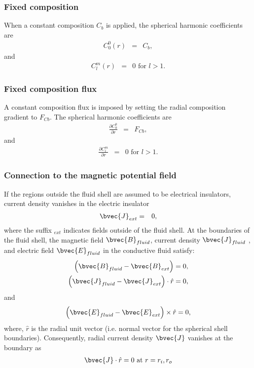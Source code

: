 \subsubsection{Fixed composition}
When a constant composition $C_{b}$ is applied, the spherical harmonic coefficients are 
%
\begin{eqnarray}
C_{0}^{0}(r) & = & C_{b},
\nonumber
\end{eqnarray}
%
and 
%
\begin{eqnarray}
C_{l}^{m}(r) & = & 0 \mbox{ for } l > 1.
\nonumber
\end{eqnarray}
%
\subsubsection{Fixed composition flux}
A constant composition flux is imposed by setting the radial composition gradient to $F_{Cb}$. The spherical harmonic coefficients are
%
\begin{eqnarray}
\frac{\partial C_{0}^{0}}{\partial r} & = &  F_{Cb},
\nonumber
\end{eqnarray}
%
and 
%
\begin{eqnarray}
\frac{\partial C_{l}^{m}}{\partial r} & = & 0 \mbox{ for } l > 1.
\nonumber
\end{eqnarray}
%
\subsubsection{Connection to the magnetic potential field}
If the regions outside the fluid shell are assumed to be electrical insulators, current density vanishes in the electric insulator
\begin{eqnarray}
\bvec{J}_{ext} &= & 0,
\nonumber
\end{eqnarray}
%
where the suffix ${}_{ext}$ indicates fields outside of the fluid shell. At the boundaries of the fluid shell, the magnetic field $\bvec{B}_{fluid}$, current density $\bvec{J}_{fluid}$ , and electric field $\bvec{E}_{fluid}$ in the conductive fluid satisfy:
\begin{eqnarray}
\left (\bvec{B}_{fluid} - \bvec{B}_{ext} \right)  = 0,
\nonumber \\
\left (\bvec{J}_{fluid} - \bvec{J}_{ext} \right)  \cdot \hat{r}   = 0,
\nonumber
\end{eqnarray}
and 
\begin{eqnarray}
\left (\bvec{E}_{fluid} - \bvec{E}_{ext} \right) \times \hat{r}  = 0,
\nonumber
\end{eqnarray}
%
where, $\hat{r}$ is the radial unit vector (i.e. normal vector for the spherical shell boundaries). 
Consequently, radial current density $\bvec{J} $ vanishes at the boundary as
\begin{eqnarray}
\bvec{J} \cdot \hat{r}  = 0
 \mbox{ at } r = r_{i}, r_{o}
\nonumber
\end{eqnarray}
%

